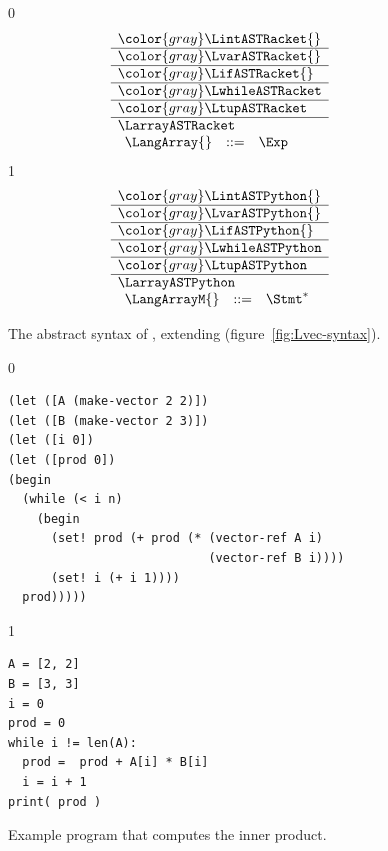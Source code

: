 \documentclass[7x10]{TimesAPriori_MIT}%
\newcommand{\gray}[1]{{\color{gray} #1}}
\def\racketEd{0}
\def\pythonEd{1}
\def\edition{0}
\numberwithin{theorem}{chapter}
\numberwithin{definition}{chapter}
\numberwithin{equation}{chapter}
\begin{document}
\begin{figure}[tp]
\centering
\begin{tcolorbox}[colback=white]
    \small
{\if\edition\racketEd    
\[
\begin{array}{l}
  \gray{\LintASTRacket{}} \\ \hline
  \gray{\LvarASTRacket{}} \\ \hline
  \gray{\LifASTRacket{}} \\ \hline
  \gray{\LwhileASTRacket} \\ \hline
  \gray{\LtupASTRacket} \\ \hline
  \LarrayASTRacket \\
\begin{array}{lcl}
  \LangArray{} &::=& \Exp
\end{array}
\end{array}
\]
\fi}
{\if\edition\pythonEd    
\[
\begin{array}{l}
  \gray{\LintASTPython{}} \\ \hline
  \gray{\LvarASTPython{}} \\ \hline
  \gray{\LifASTPython{}} \\ \hline
  \gray{\LwhileASTPython} \\ \hline
  \gray{\LtupASTPython} \\ \hline
  \LarrayASTPython \\
\begin{array}{rcl}
  \LangArrayM{} &::=& \Stmt^{*}
\end{array}
\end{array}
\]
\fi}
\end{tcolorbox}
\caption{The abstract syntax of \LangArray{}, extending \LangVec{} (figure~\ref{fig:Lvec-syntax}).}
\label{fig:Lvecof-syntax}
\end{figure}


\begin{figure}[tp]
\begin{tcolorbox}[colback=white]  
{\if\edition\racketEd
\begin{lstlisting}
(let ([A (make-vector 2 2)])
(let ([B (make-vector 2 3)])
(let ([i 0])
(let ([prod 0])
(begin
  (while (< i n)
    (begin
      (set! prod (+ prod (* (vector-ref A i)
                            (vector-ref B i))))
      (set! i (+ i 1))))
  prod)))))
\end{lstlisting}
\fi}
{\if\edition\pythonEd    
\begin{lstlisting}
A = [2, 2]
B = [3, 3]
i = 0
prod = 0
while i != len(A):
  prod =  prod + A[i] * B[i]
  i = i + 1
print( prod )
\end{lstlisting}
\fi}
\end{tcolorbox}

\caption{Example program that computes the inner product.}
\label{fig:inner_product}
\end{figure}
\end{document}

